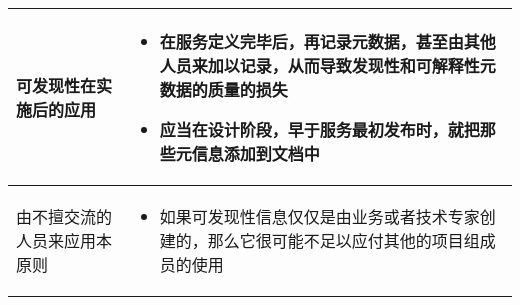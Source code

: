 \begin{longtable}{|m{3cm}<{\centering}|m{12cm}|}
    \hline
    可发现性在实施后的应用
    & 
    \vspace{-1.3em}
    \begin{itemize}[leftmargin=1.5em,itemsep=-3pt,topsep=-3pt]
        \item 在服务定义完毕后，再记录元数据，甚至由其他人员来加以记录，从而导致发现性和可解释性元数据的质量的损失
        \item 应当在设计阶段，早于服务最初发布时，就把那些元信息添加到文档中 
    \vspace{-1.5em}
    \end{itemize}  
    \\ \hline
    由不擅交流的人员来应用本原则
    & 
    \vspace{-1.3em}
    \begin{itemize}[leftmargin=1.5em,itemsep=-3pt,topsep=-3pt]
        \item 如果可发现性信息仅仅是由业务或者技术专家创建的，那么它很可能不足以应付其他的项目组成员的使用
    \vspace{-1.5em}
    \end{itemize}  
    \\ \hline
\end{longtable}
